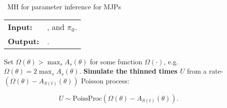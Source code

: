 \begin{algorithm}[H]
   \caption{\Naive\  MH for parameter inference for MJPs }
   \label{alg:MH_naive}
  \begin{tabular}{l l}
   \textbf{Input:  } & \text{Observations $X$}, 
                       \text{the MJP path $S(t) = (s_0, S, T)$, the  parameters $\theta$ }and $\pi_0$.\\ 
   \textbf{Output:  }& \text{A new MJP trajectory $S'(t) = (s'_0, S', T')$, 
                            new MJP parameters $\theta'$}.\\
   \hline
   \end{tabular}
   \begin{algorithmic}[1]
     \State Set $\Omega(\theta) > \max_s{A_s(\theta)}$ for
     some function $\Omega(\cdot)$, e.g.\ $\Omega(\theta) = 
      2\max_s A_s(\theta)$.
      \State \textbf{Simulate the thinned times $U$} from a rate-$(\Omega(\theta)-A_{S(t)}(\theta))$ Poisson process: 

      $\qquad \qquad \qquad \qquad U \sim \text{PoissProc}(\Omega(\theta) - A_{S(t)}(\theta)).$


\end{algorithmic}
\end{algorithm}
